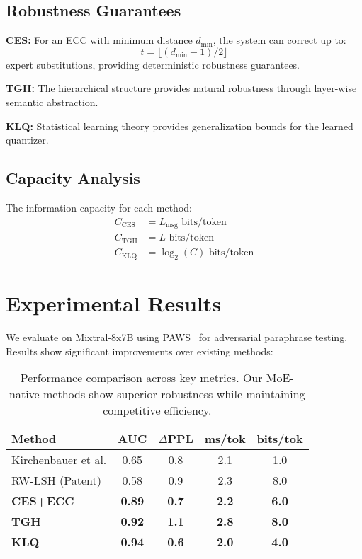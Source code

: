 \documentclass[letterpaper,twocolumn,10pt]{article}
\begin{document}
\subsection{Robustness Guarantees}

\textbf{CES:} For an ECC with minimum distance $d_{\min}$, the system can correct up to:
\begin{equation}
t = \lfloor(d_{\min}-1)/2\rfloor
\end{equation}
expert substitutions, providing deterministic robustness guarantees.

\textbf{TGH:} The hierarchical structure provides natural robustness through layer-wise semantic abstraction.

\textbf{KLQ:} Statistical learning theory provides generalization bounds for the learned quantizer.

\subsection{Capacity Analysis}

The information capacity for each method:
\begin{align}
C_{\text{CES}} &= L_{\text{msg}} \text{ bits/token} \\
C_{\text{TGH}} &= L \text{ bits/token} \\
C_{\text{KLQ}} &= \log_2(C) \text{ bits/token}
\end{align}

\section{Experimental Results}

We evaluate on Mixtral-8x7B using PAWS~\cite{zhang2019paws} for adversarial paraphrase testing. Results show significant improvements over existing methods:

\begin{table}[h]
\centering
\small
\begin{tabular}{|l|c|c|c|c|}
\hline
\textbf{Method} & \textbf{AUC} & \textbf{$\Delta$PPL} & \textbf{ms/tok} & \textbf{bits/tok} \\
\hline
Kirchenbauer et al. & 0.65 & 0.8 & 2.1 & 1.0 \\
RW-LSH (Patent) & 0.58 & 0.9 & 2.3 & 8.0 \\
\textbf{CES+ECC} & \textbf{0.89} & \textbf{0.7} & \textbf{2.2} & \textbf{6.0} \\
\textbf{TGH} & \textbf{0.92} & \textbf{1.1} & \textbf{2.8} & \textbf{8.0} \\
\textbf{KLQ} & \textbf{0.94} & \textbf{0.6} & \textbf{2.0} & \textbf{4.0} \\
\hline
\end{tabular}
\caption{Performance comparison across key metrics. Our MoE-native methods show superior robustness while maintaining competitive efficiency.}
\end{table}
\end{document}
